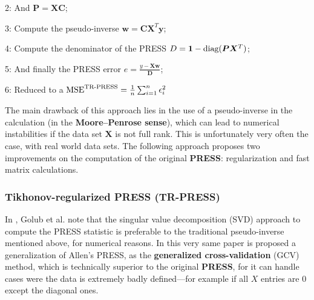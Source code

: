 2: And $\bm P = \bm X\bm C$;

3: Compute the pseudo-inverse $\bm w = \bm C\bm X^T\bm y$;

4: Compute the denominator of the PRESS $D = \bm 1-\textup{diag}(\bm P\bm X^T)$;

5: And finally the PRESS error $e = \frac{y-\bm X \bm w} {\bm D} $;

6: Reduced to a $\textup{MSE}^{\textup{TR-PRESS}}=\frac 1 n \sum_{i=1}^n \epsilon_i^2$

The main drawback of this approach lies in the use of a pseudo-inverse in the calculation (in the \textbf{Moore–Penrose sense}), which can lead to numerical instabilities if the data set $\bm X$ is not full rank. This is unfortunately very often the case, with real world data sets. The following approach proposes two improvements on the computation of the original \textbf{PRESS}: regularization and fast matrix calculations.
\subsubsection{Tikhonov-regularized PRESS (TR-PRESS)}
In \cite{Golub1979Generalized}, Golub et al. note that the singular value decomposition (SVD) approach to compute the PRESS statistic is preferable to the traditional pseudo-inverse mentioned above, for numerical reasons. In this very same paper is proposed a generalization of Allen's PRESS, as the \textbf{generalized cross-validation} (GCV) method, which is technically superior to the original \textbf{PRESS}, for it can handle cases were the data is extremely badly defined—for example if all $X$ entries are 0 except the diagonal ones.


